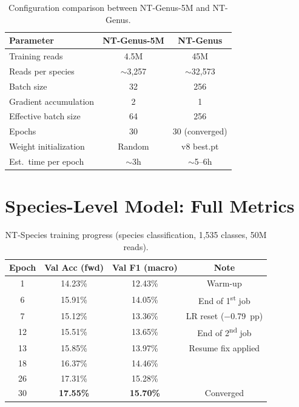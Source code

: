 \begin{table}[htbp]
    \centering
    \caption{Configuration comparison between NT-Genus-5M and NT-Genus.}
    \label{tab:v9-config}
    \begin{tabular}{lcc}
        \toprule
        \textbf{Parameter} & \textbf{NT-Genus-5M} & \textbf{NT-Genus} \\
        \midrule
        Training reads & 4.5M & 45M \\
        Reads per species & $\sim$3,257 & $\sim$32,573 \\
        Batch size & 32 & 256 \\
        Gradient accumulation & 2 & 1 \\
        Effective batch size & 64 & 256 \\
        Epochs & 30 & 30 (converged) \\
        Weight initialization & Random & v8 best.pt \\
        Est.\ time per epoch & $\sim$3h & $\sim$5--6h \\
        \bottomrule
    \end{tabular}
\end{table}

\section{Species-Level Model: Full Metrics}
\label{app:species-metrics}

\begin{table}[htbp]
    \centering
    \caption{NT-Species training progress (species classification, 1,535 classes, 50M reads).}
    \label{tab:spv4-progress}
    \begin{tabular}{cccc}
        \toprule
        \textbf{Epoch} & \textbf{Val Acc (fwd)} & \textbf{Val F1 (macro)} & \textbf{Note} \\
        \midrule
        1  & 14.23\% & 12.43\% & Warm-up \\
        6  & 15.91\% & 14.05\% & End of 1\textsuperscript{st} job \\
        7  & 15.12\% & 13.36\% & LR reset (−0.79~pp) \\
        12 & 15.51\% & 13.65\% & End of 2\textsuperscript{nd} job \\
        13 & 15.85\% & 13.97\% & Resume fix applied \\
        18 & 16.37\% & 14.46\% & \\
        26 & 17.31\% & 15.28\% & \\
        30 & \textbf{17.55\%} & \textbf{15.70\%} & Converged \\
        \bottomrule
    \end{tabular}
\end{table}


